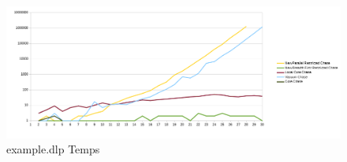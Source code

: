 \begin{figure}
\centering
\includegraphics[width=\textwidth]{pictures/benchmark new/examplenewtimes.png}
\caption{example.dlp Temps}
\label{fig:examplenewtime}
\end{figure}
